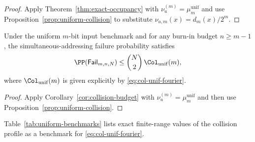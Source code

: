 \begin{proof}
Apply Theorem~\ref{thm:exact-occupancy} with $\nu_u^{(m)}=\mu_m^{\mathrm{unif}}$ and use Proposition~\ref{prop:uniform-collision} to substitute $\nu_{u,m}(x)=d_m(x)/2^m$.
\end{proof}

\begin{corollary}\label{cor:explicit-finite-m-capacity}
Under the uniform $m$-bit input benchmark and for any burn-in budget $n\ge m-1$, the simultaneous-addressing failure probability satisfies
\[
\PP(\mathsf{Fail}_{m,n,N})\le \binom{N}{2}\,\Col_{\mathrm{unif}}(m),
\]
where $\Col_{\mathrm{unif}}(m)$ is given explicitly by \eqref{eq:col-unif-fourier}.
\end{corollary}

\begin{proof}
Apply Corollary~\ref{cor:collision-budget} with $\nu_u^{(m)}=\mu_m^{\mathrm{unif}}$ and then use Proposition~\ref{prop:uniform-collision}.
\end{proof}

\begin{remark}
Table~\ref{tab:uniform-benchmarks} lists exact finite-range values of the collision profile as a benchmark for \eqref{eq:col-unif-fourier}.
\end{remark}
